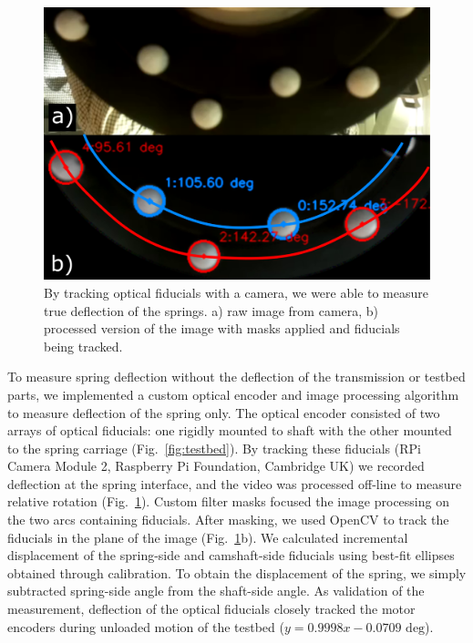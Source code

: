 \documentclass[letterpaper, 10 pt, conference]{ieeeconf} %
\begin{document}
\begin{figure}[t!]
    \centering
    \includegraphics[width=\columnwidth]{figs/fiducial_fig.png}
    \caption{By tracking optical fiducials with a camera, we were able to measure true deflection of the springs. a) raw image from camera, b) processed version of the image with masks applied and fiducials being tracked.}
    \label{fig:fiducial}
\end{figure}

To measure spring deflection without the deflection of the transmission or testbed parts, we implemented a custom optical encoder and image processing algorithm to measure deflection of the spring only. The optical encoder consisted of two arrays of optical fiducials: one rigidly mounted to shaft with the other mounted to the spring carriage (Fig.~\ref{fig:testbed}). By tracking these fiducials (RPi Camera Module 2, Raspberry Pi Foundation, Cambridge UK) we recorded deflection at the spring interface, and the video was processed off-line to measure relative rotation (Fig.~\ref{fig:fiducial}). Custom filter masks focused the image processing on the two arcs containing fiducials. After masking, we used OpenCV \cite{opencv_library} to track the fiducials in the plane of the image (Fig.~\ref{fig:fiducial}b). We calculated incremental displacement of the spring-side and camshaft-side fiducials using best-fit ellipses obtained through calibration. To obtain the displacement of the spring, we simply subtracted spring-side angle from the shaft-side angle. As validation of the measurement, deflection of the optical fiducials closely tracked the motor encoders during unloaded motion of the testbed ($y=\text{0.9998}x-\text{0.0709 deg}$).
\end{document}
